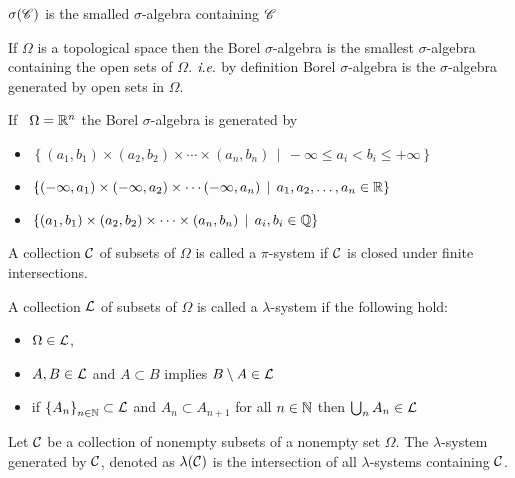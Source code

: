 $\sigma({\mathscr C})$ is the smalled $\sigma$-algebra containing ${\mathscr C}$

\begin{definition}
    If $\Omega$ is a topological space then the Borel $\sigma$-algebra is the smallest $\sigma$-algebra containing the open sets of $\Omega$. $\textit{i}.\textit{e}.$ by definition Borel $\sigma$-algebra is the $\sigma$-algebra generated by open sets in $\Omega$.
    \label{def:borel-sigma-algebra}
\end{definition}


\begin{fact}
    If \ $\Omega = \mathbb R ^n$ the Borel $\sigma$-algebra is generated by
    \begin{itemize}
	\item $\left\{ \left( a_1 , b_1 \right) \times \left( a_2 , b_2 \right) \times\cdots \times \left( a_n , b_n \right) \, \mid \, -\infty \le a_i < b_i \le +\infty  \right\} $
	\item $\left\{ \left( -\infty , a_1 \right) \times \left( -\infty , a_2 \right) \times \cdots \left( -\infty , a_n \right) \, \mid \, a_1 ,a_2, \ldots , a_n \in \mathbb R \right\}$
	\item $\left\{ \left( a_1 , b_1 \right)\times \left( a_2 , b_2 \right) \times \cdots \times \left( a_n , b_n \right) \, \mid \, a_i , b_i \in \mathbb Q \right\}$
    \end{itemize}
\end{fact}

\begin{definition}
    A collection ${\cal C}$ of subsets of $\Omega$ is called a $\pi$-system if ${\cal C}$ is closed under finite intersections.

    A collection ${\cal L}$ of subsets of $\Omega$ is called a $\lambda$-system if the following hold:
    \begin{itemize}
	    \item $\Omega \in {\cal L}$,
	    \item $A,B\in {\cal L}$ and $A\subset B$ implies $B\setminus A \in {\cal L}$
	    \item if $\left\{ A_n \right\}_{n \in \mathbb N} \subset {\cal L}$ and $A_n \subset A_{n+1}$ for all $n\in \mathbb N$ then $\bigcup_{n} A_n \in {\cal L}$
    \end{itemize}
    \label{def:pi-system}
    \label{def:lambda-system}
\end{definition}

\begin{definition}
    Let ${\cal C}$ be a collection of nonempty subsets of a nonempty set $\Omega$. The $\lambda$-system generated by ${\cal C}$, denoted as $\lambda ({\cal C} )$ is the intersection of all $\lambda$-systems containing ${\cal C}$.
    \label{def:generated-lambda-system}
\end{definition}



